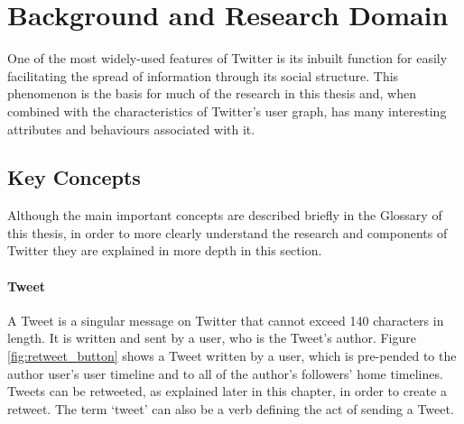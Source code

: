 \chapter{Background and Research Domain}


One of the most widely-used features of Twitter is its inbuilt function for easily facilitating the spread of information through its social structure. This phenomenon is the basis for much of the research in this thesis and, when combined with the characteristics of Twitter's user graph, has many interesting attributes and behaviours associated with it.

\section{Key Concepts}
Although the main important concepts are described briefly in the Glossary of this thesis, in order to more clearly understand the research and components of Twitter they are explained in more depth in this section.

\subsubsection{Tweet}
A Tweet is a singular message on Twitter that cannot exceed 140 characters in length. It is written and sent by a user, who is the Tweet's author. Figure \ref{fig:retweet_button} shows a Tweet written by a user, which is pre-pended to the author user's user timeline and to all of the author's followers' home timelines. Tweets can be retweeted, as explained later in this chapter, in order to create a retweet. The term `tweet' can also be a verb defining the act of sending a Tweet.

